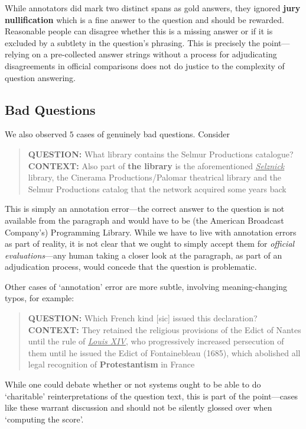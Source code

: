While annotators did mark two distinct spans as gold answers, they
ignored \textbf{jury nullification} which is a fine answer to the
question and should be rewarded.
Reasonable people can disagree whether this is a missing answer or if
it is excluded by a subtlety in the question's phrasing.
This is precisely the point---relying on a pre-collected answer
strings without a process for adjudicating disagreements in official
comparisons does not do justice to the complexity of question
answering.

\subsection{Bad Questions}

We also observed $5$ cases of genuinely bad questions.  Consider
\begin{quote}
    {\bf QUESTION:}
    What library contains the Selmur Productions catalogue?
 \\
   {\bf CONTEXT:}
    Also part of \textbf{the library} is the aforementioned
    \underline{\textit{Selznick}} library, the Cinerama
    Productions/Palomar theatrical library and the Selmur Productions
    catalog that the network acquired some years back
\end{quote}

This is simply an annotation error---the correct answer to the question is not available
from the paragraph and would have to be (the American Broadcast Company's) Programming Library.
While we have to live with annotation errors as part of reality, it is not clear that we 
ought to simply accept them for \emph{official evaluations}---any human taking a closer look
at the paragraph, as part of an adjudication process, would concede that the question is
problematic.

Other cases of `annotation' error are more subtle, involving
meaning-changing typos, for example:

\begin{quote}
    {\bf QUESTION:}
    Which French kind [sic] issued this declaration?
 \\
   {\bf CONTEXT:}
   They retained the religious provisions of the Edict of Nantes until
   the rule of \textit{\uline{Louis XIV}}, who progressively increased
   persecution of them until he issued the Edict of Fontainebleau
   (1685), which abolished all legal recognition of
   \textbf{Protestantism} in France
\end{quote}

While one could debate whether or not systems ought to be able to do
`charitable' reinterpretations of the question text, this is part of
the point---cases like these warrant discussion and should not be
silently glossed over when `computing the score'.
